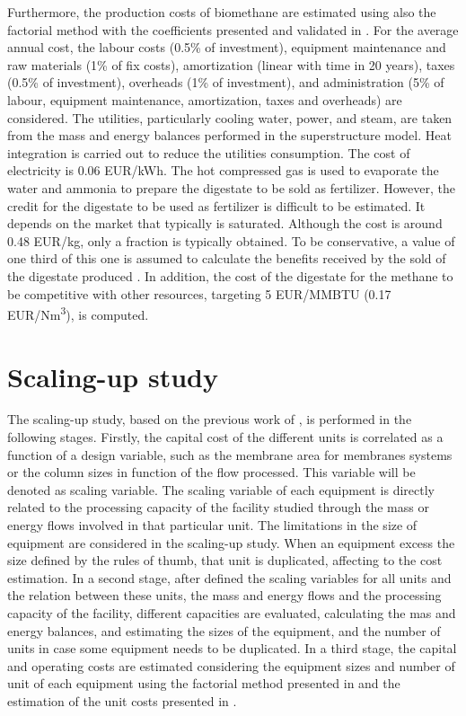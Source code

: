 \begin{refsection}[referencesCh7]
Furthermore, the production costs of biomethane are estimated using also the factorial method with the coefficients presented and validated in \citet{davis2014optimala}. For the average annual cost, the labour costs (0.5\% of investment), equipment maintenance and raw materials (1\% of fix costs), amortization (linear with time in 20 years), taxes (0.5\% of investment), overheads (1\% of investment), and administration (5\% of labour, equipment maintenance, amortization, taxes and overheads) are considered. The utilities, particularly cooling water, power, and steam, are taken from the mass and energy balances performed in the superstructure model. Heat integration is carried out to reduce the utilities consumption. The cost of electricity is 0.06 EUR/kWh. The hot compressed gas is used to evaporate the water and ammonia to prepare the digestate to be sold as fertilizer. However, the credit for the digestate to be used as fertilizer is difficult to be estimated. It depends on the market that typically is saturated. Although the cost is around 0.48 EUR/kg, only a fraction is typically obtained. To be conservative, a value of one third of this one is assumed to calculate the benefits received by the sold of the digestate produced \citep{leon2016optimal}. In addition, the cost of the digestate for the methane to be competitive with other resources, targeting 5 EUR/MMBTU (0.17 EUR/Nm\textsuperscript{3}), is computed. 

\section{Scaling-up study} \label{section:SuppMatPaperCO2Section4}
The scaling-up study, based on the previous work of \citet{sanchez2018scale}, is performed in the following stages. Firstly, the capital cost of the different units is correlated as a function of a design variable, such as the membrane area for membranes systems or the column sizes in function of the flow processed. This variable will be denoted as scaling variable. The scaling variable of each equipment is directly related to the processing capacity of the facility studied through the mass or energy flows involved in that particular unit. The limitations in the size of equipment are considered in the scaling-up study. When an equipment excess the size defined by the rules of thumb, that unit is duplicated, affecting to the cost estimation. In a second stage, after defined the scaling variables for all units and the relation between these units, the mass and energy flows and the processing capacity of the facility, different capacities are evaluated, calculating the mas and energy balances, and estimating the sizes of the equipment, and the number of units in case some equipment needs to be duplicated. In a third stage, the capital and operating costs are estimated considering the equipment sizes and number of unit of each equipment using the factorial method presented in \citet{towler2009chemical} and the estimation of the unit costs presented in \citet{almena2016technoeconomic}.


\end{refsection}
